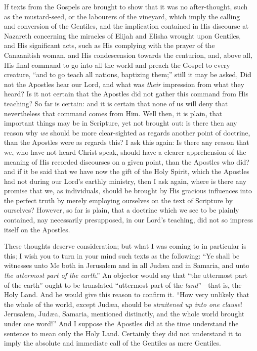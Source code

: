 If texts from the Gospels are brought to show that it was no
after-thought, such as the mustard-seed, or the labourers of the
vineyard, which imply the calling and conversion of the Gentiles, and
the implication contained in His discourse at Nazareth concerning the
miracles of Elijah and Elisha wrought upon Gentiles, and His
significant acts, such as His complying with the prayer of the
Canaanitish woman, and His condescension towards the centurion, and,
above all, His final command to go into all the world and preach the
Gospel to every creature, ``and to go teach all nations, baptizing
them;'' still it may be asked, Did not the Apostles hear our Lord,
and what was \emph{their} impression from what they heard? Is it not
certain that the Apostles did not gather this command from His
teaching? So far is certain: and it is certain that none of us will
deny that nevertheless that command comes from Him. Well then, it is
plain, that important things may be in Scripture, yet not brought out:
is there then any reason why \emph{we} should be more clear-sighted as
regards another point of doctrine, than the Apostles were as regards
this? I ask this again: Is there any reason that we, who have not
heard Christ speak, should have a clearer apprehension of the meaning
of His recorded discourses on a given point, than the Apostles who
did? and if it be said that we have now the gift of the Holy Spirit,
which the Apostles had not during our Lord's earthly ministry, then I
ask again, where is there any promise that we, as individuals, should
be brought by His gracious influences into the perfect truth by merely
employing ourselves on the text of Scripture by ourselves? However, so
far is plain, that a doctrine which we see to be plainly contained,
nay necessarily presupposed, in our Lord's teaching, did not so
impress itself on the Apostles.

These thoughts deserve consideration; but what I was coming to in
particular is this; I wish you to turn in your mind such texts as the
following: ``Ye shall be witnesses unto Me both in Jerusalem and
in all Judæa and in Samaria, and unto \emph{the uttermost part of the
earth}.'' An objector would say that ``the uttermost part
of the earth'' ought to be translated ``uttermost part
of the \emph{land}''—that is, the Holy Land. And he would give
this reason to confirm it. ``How very unlikely that the whole of
the world, except Judæa, should be \emph{straitened up into one clause}!
Jerusalem, Judæa, Samaria, mentioned distinctly, and the whole world
brought under one word!'' And I suppose the Apostles did at the
time understand the sentence to mean only the Holy Land. Certainly
they did not understand it to imply the absolute and immediate call of
the Gentiles as mere Gentiles.

